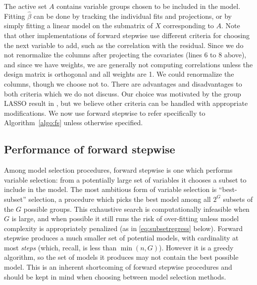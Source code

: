 \documentclass{imsart}
\begin{document}
The active set $A$ contains variable groups chosen to be included in
the model. Fitting $\hat \beta$ can be done by tracking the individual
fits and projections, or by simply fitting a linear model on the submatrix
of $X$ corresponding to $A$. 
 Note that other
implementations of forward stepwise use different criteria for choosing
the next variable to add, such as the correlation with the residual.
Since we do not renormalize the columns after projecting the covariates
(lines 6 to 8 above), and since we have weights, we are generally not computing
correlations unless the design matrix is orthogonal and all weights are 1. We could
renormalize the columns, though we choose not to.
There are advantages and disadvantages to both criteria which we do not
discuss. Our choice was motivated by the group LASSO result in
\cite{tests:adaptive}, but we believe other criteria can be handled
with appropriate modifications.
We now use forward stepwise to refer specifically to
Algorithm~\ref{algo:fs} unless otherwise specified.

\subsection{Performance of forward stepwise}
\label{sec:fs:performance}

Among model selection procedures, forward stepwise is one which performs
variable selection: from a potentially large set of variables it chooses
a subset to include in the model. The most ambitious form of variable
selection is  ``best-subset'' selection, a procedure which picks the
best model among all $2^G$ subsets of the $G$ possible groups.
This exhaustive search is computationally infeasible when $G$ is
large, and when possible it still
runs the risk of over-fitting unless model complexity is
appropriately penalized (as in \eqref{eq:subsetregress} below).
Forward stepwise produces a much
smaller set of potential models, with cardinality at most
\textit{steps} (which, recall, is less than $\min(n,G)$). However
it is a greedy algorithm, so the set of models it produces may not
contain the best possible model. This is an inherent shortcoming of
forward stepwise procedures and should be kept in mind when choosing
between model selection methods.
\end{document}

